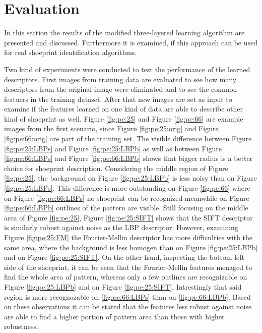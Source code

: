 \documentclass[draft,final]{vutinfth} %
\begin{document}
\section{Evaluation}
\par
In this section the results of the modified three-layered learning algorithm are presented and discussed.
Furthermore it is examined, if this approach can be used for real shoeprint identification algorithms.
\par
Two kind of experiments were conducted to test the performance of the learned descriptors.
First images from training data are evaluated to see how many descriptors from the original image were eliminated and to see the common featuers in the training dataset.
After that new images are set as input to examine if the features learned on one kind of data are able to describe other kind of shoeprint as well.
Figure \ref{fig:pe:25} and Figure \ref{fig:pe:66} are example images from the first scenario, since Figure \ref{fig:pe:25:orig} and Figure \ref{fig:pe:66:orig} are part of the training set.
The visible difference between Figure \ref{fig:pe:25:LBPs} and Figure \ref{fig:pe:25:LBPb} as well as between Figure \ref{fig:pe:66:LBPs} and Figure \ref{fig:pe:66:LBPb} shows that bigger radius is a better choice for shoeprint description.
Considering the middle region of Figure \ref{fig:pe:25}, the background on Figure \ref{fig:pe:25:LBPb} is less noisy than on Figure \ref{fig:pe:25:LBPs}.
This difference is more outstanding on  Figure \ref{fig:pe:66} where on Figure \ref{fig:pe:66:LBPs} no shoeprint can be recognized meanwhile on Figure \ref{fig:pe:66:LBPb} outlines of the pattern are visible.
Still focusing on the middle area of Figure \ref{fig:pe:25}, Figure \ref{fig:pe:25:SIFT} shows that the SIFT descriptor is similarly robust against noise as the LBP descriptor.
However, examining Figure  \ref{fig:pe:25:FM} the Fourier-Mellin descriptor has more difficulties with the same area, where the background is less homogen than on  Figure \ref{fig:pe:25:LBPb} and on Figure \ref{fig:pe:25:SIFT}.
On the other hand, inspecting the bottom left side of the shoeprint, it can be seen that the Fourier-Mellin features menaged to find the whole area of pattern, whereas only a few outlines are recognizable on Figure \ref{fig:pe:25:LBPb} and on Figure \ref{fig:pe:25:SIFT}.
Intrestingly that said region is more recognozable on  \ref{fig:pe:66:LBPs} than on  \ref{fig:pe:66:LBPb}.
Based on these observations it can be stated that the features less robust against noise are able to find a higher portion of pattern area than those with higher robustness.
\end{document}
